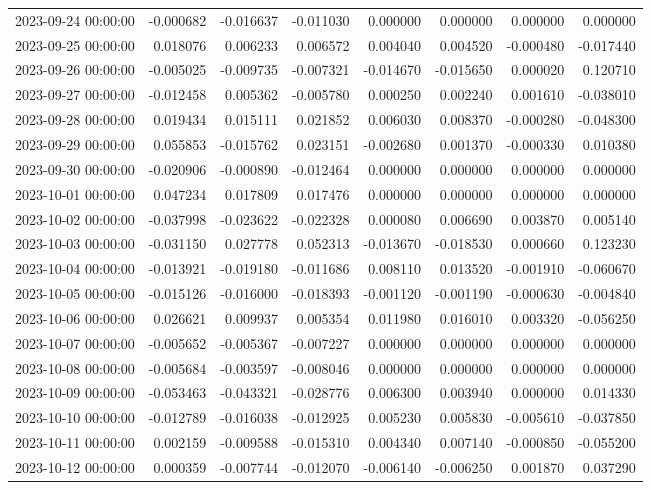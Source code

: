 \begin{tabular}{lrrrrrrr}
2023-09-24 00:00:00 & -0.000682 & -0.016637 & -0.011030 & 0.000000 & 0.000000 & 0.000000 & 0.000000 \\
2023-09-25 00:00:00 & 0.018076 & 0.006233 & 0.006572 & 0.004040 & 0.004520 & -0.000480 & -0.017440 \\
2023-09-26 00:00:00 & -0.005025 & -0.009735 & -0.007321 & -0.014670 & -0.015650 & 0.000020 & 0.120710 \\
2023-09-27 00:00:00 & -0.012458 & 0.005362 & -0.005780 & 0.000250 & 0.002240 & 0.001610 & -0.038010 \\
2023-09-28 00:00:00 & 0.019434 & 0.015111 & 0.021852 & 0.006030 & 0.008370 & -0.000280 & -0.048300 \\
2023-09-29 00:00:00 & 0.055853 & -0.015762 & 0.023151 & -0.002680 & 0.001370 & -0.000330 & 0.010380 \\
2023-09-30 00:00:00 & -0.020906 & -0.000890 & -0.012464 & 0.000000 & 0.000000 & 0.000000 & 0.000000 \\
2023-10-01 00:00:00 & 0.047234 & 0.017809 & 0.017476 & 0.000000 & 0.000000 & 0.000000 & 0.000000 \\
2023-10-02 00:00:00 & -0.037998 & -0.023622 & -0.022328 & 0.000080 & 0.006690 & 0.003870 & 0.005140 \\
2023-10-03 00:00:00 & -0.031150 & 0.027778 & 0.052313 & -0.013670 & -0.018530 & 0.000660 & 0.123230 \\
2023-10-04 00:00:00 & -0.013921 & -0.019180 & -0.011686 & 0.008110 & 0.013520 & -0.001910 & -0.060670 \\
2023-10-05 00:00:00 & -0.015126 & -0.016000 & -0.018393 & -0.001120 & -0.001190 & -0.000630 & -0.004840 \\
2023-10-06 00:00:00 & 0.026621 & 0.009937 & 0.005354 & 0.011980 & 0.016010 & 0.003320 & -0.056250 \\
2023-10-07 00:00:00 & -0.005652 & -0.005367 & -0.007227 & 0.000000 & 0.000000 & 0.000000 & 0.000000 \\
2023-10-08 00:00:00 & -0.005684 & -0.003597 & -0.008046 & 0.000000 & 0.000000 & 0.000000 & 0.000000 \\
2023-10-09 00:00:00 & -0.053463 & -0.043321 & -0.028776 & 0.006300 & 0.003940 & 0.000000 & 0.014330 \\
2023-10-10 00:00:00 & -0.012789 & -0.016038 & -0.012925 & 0.005230 & 0.005830 & -0.005610 & -0.037850 \\
2023-10-11 00:00:00 & 0.002159 & -0.009588 & -0.015310 & 0.004340 & 0.007140 & -0.000850 & -0.055200 \\
2023-10-12 00:00:00 & 0.000359 & -0.007744 & -0.012070 & -0.006140 & -0.006250 & 0.001870 & 0.037290 \\

\end{tabular}
